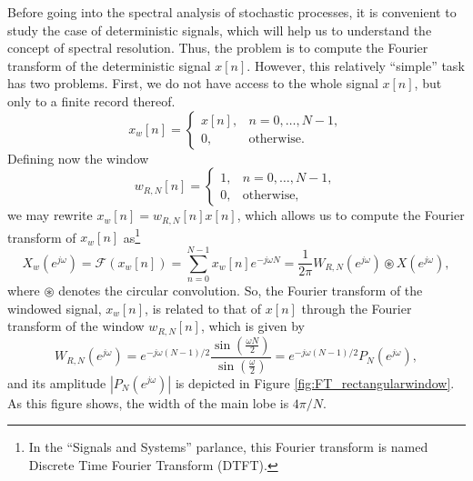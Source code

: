 Before going into the spectral analysis of stochastic processes, it is convenient to study the case of deterministic signals, which will help us to understand the concept of spectral resolution. Thus, the problem is to compute the Fourier transform of the deterministic signal $x[n]$. However, this relatively ``simple'' task has two problems. First, we do not have access to the whole signal $x[n]$, but only to a finite record thereof.
\begin{equation*}
   x_w[n]  = \begin{cases}
   x[n], & n = 0, \ldots, N-1, \\
   0, & \text{otherwise.}
   \end{cases}
\end{equation*}
Defining now the window
\begin{equation*}
w_{R,N}[n]  = \begin{cases}
1, & n = 0, \ldots, N-1, \\
0, & \text{otherwise,}
\end{cases}
\end{equation*}
we may rewrite $x_w[n] = w_{R,N}[n] x[n]$, which allows us to compute the Fourier transform of $x_w[n]$ as\footnote{In the ``Signals and Systems'' parlance, this Fourier transform is named Discrete Time Fourier Transform (DTFT).}
\begin{equation}
\label{eq:DTFT}
X_w(e^{j \omega}) = \mathcal{F} \left(x_w[n]\right) = \sum_{n = 0}^{N-1} x_w[n] e^{- j \omega N} = \frac{1}{2 \pi} W_{R,N}(e^{j \omega}) \circledast X(e^{j \omega}),
\end{equation}
where $\circledast$ denotes the circular convolution. So, the Fourier transform of the windowed signal, $x_w[n]$, is related to that of $x[n]$ through the Fourier transform of the window $w_{R,N}[n]$, which is given by
\begin{equation*}
W_{R,N}(e^{j \omega}) = e^{-j \omega (N-1)/2} \frac{\sin\left(\frac{\omega N}{2}\right)}{\sin\left(\frac{\omega}{2}\right)} = e^{-j \omega (N-1)/2} P_N(e^{j \omega}),
\end{equation*}
and its amplitude $|P_N(e^{j \omega})|$ is depicted in Figure \ref{fig:FT_rectangularwindow}. As this figure shows, the width of the main lobe is $4 \pi/N$.

